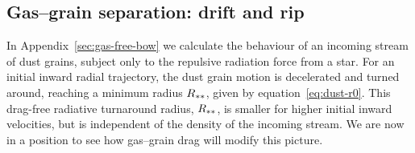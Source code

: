


\subsection{Gas--grain separation: drift and rip}
\label{sec:gas-grain-separ}

In Appendix~\ref{sec:gas-free-bow} we calculate the behaviour of an
incoming stream of dust grains, subject only to the repulsive
radiation force from a star.  For an initial inward radial trajectory,
the dust grain motion is decelerated and turned around, reaching a
minimum radius \(R_{**}\), given by equation~\eqref{eq:dust-r0}.
This drag-free radiative turnaround radius, \(R_{**}\), is smaller
for higher initial inward velocities, but is independent of the
density of the incoming stream.  We are now in a position to see how
gas--grain drag will modify this picture.

